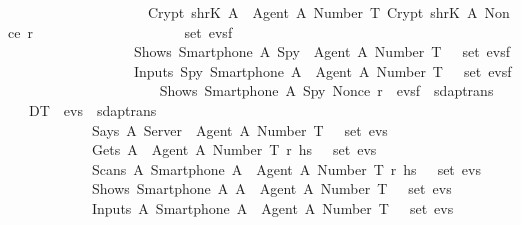 \begin{isabellebody}
  \ \ \ \ \ \ \ \ \ \ \ \ \ \ \ \ \ \ \ \ Crypt\ {\isacharparenleft}shrK\ A{\isacharparenright}\ {\isasymlbrace}\ {\isasymlbrace}Agent\ A{\isacharcomma}\ Number\ T{\isasymrbrace}{\isacharcomma}\ Crypt\ {\isacharparenleft}shrK\ A{\isacharparenright}\ {\isacharparenleft}Nonce\ r{\isacharparenright}\ {\isasymrbrace}\isanewline
  \ \ \ \ \ \ \ \ \ \ \ \ \ \ \ \ \ \ {\isasymrbrace}\ {\isasymin}\ set\ evs{}f{\isacharsemicolon}\isanewline
  \ \ \ \ \ \ \ \ \ \ \ \ \ \ \ \ \ \ Shows\ {\isacharparenleft}Smartphone\ A{\isacharparenright}\ Spy\ {\isasymlbrace}\ Agent\ A{\isacharcomma}\ Number\ T\ {\isasymrbrace}\ {\isasymin}\ set\ evs{}f{\isacharsemicolon}\isanewline
  \ \ \ \ \ \ \ \ \ \ \ \ \ \ \ \ \ \ Inputs\ Spy\ {\isacharparenleft}Smartphone\ A{\isacharparenright}\ {\isasymlbrace}\ Agent\ A{\isacharcomma}\ Number\ T\ {\isasymrbrace}\ {\isasymin}\ set\ evs{}f\isanewline
  \ \ \ \ \ \ \ \ \ \ \ \ \ \ \ \ {\isasymrbrakk}\isanewline
  \ \ \ \ {\isasymLongrightarrow}\ Shows\ {\isacharparenleft}Smartphone\ A{\isacharparenright}\ Spy\ {\isacharparenleft}Nonce\ r{\isacharparenright}\ {\isacharhash}\ evs{}f\ {\isasymin}\ sdaptrans{\isachardoublequoteclose}\isanewline
  \isanewline
  \ \ {\isacharbar}\ DT{}{\isacharcolon}\ {\isachardoublequoteopen}{\isasymlbrakk}\ evs{}\ {\isasymin}\ sdaptrans{\isacharsemicolon}\isanewline
  \ \ \ \ \ \ \ \ \ \ \ \ Says\ A\ Server\ {\isasymlbrace}\ Agent\ A{\isacharcomma}\ Number\ T\ {\isasymrbrace}\ {\isasymin}\ set\ evs{}{\isacharsemicolon}\isanewline
  \ \ \ \ \ \ \ \ \ \ \ \ Gets\ A\ {\isasymlbrace}\ {\isasymlbrace}Agent\ A{\isacharcomma}\ Number\ T{\isasymrbrace}{\isacharcomma}\ r{\isacharprime}{\isacharcomma}\ h\isactrlsub s\ {\isasymrbrace}\ {\isasymin}\ set\ evs{}{\isacharsemicolon}\isanewline
  \ \ \ \ \ \ \ \ \ \ \ \ Scans\ A\ {\isacharparenleft}Smartphone\ A{\isacharparenright}\ {\isasymlbrace}\ {\isasymlbrace}Agent\ A{\isacharcomma}\ Number\ T{\isasymrbrace}{\isacharcomma}\ r{\isacharprime}{\isacharcomma}\ h\isactrlsub s\ {\isasymrbrace}\ {\isasymin}\ set\ evs{}{\isacharsemicolon}\isanewline
  \ \ \ \ \ \ \ \ \ \ \ \ Shows\ {\isacharparenleft}Smartphone\ A{\isacharparenright}\ A\ {\isasymlbrace}\ Agent\ A{\isacharcomma}\ Number\ T\ {\isasymrbrace}\ {\isasymin}\ set\ evs{}{\isacharsemicolon}\isanewline
  \ \ \ \ \ \ \ \ \ \ \ \ Inputs\ A\ {\isacharparenleft}Smartphone\ A{\isacharparenright}\ {\isasymlbrace}\ Agent\ A{\isacharcomma}\ Number\ T\ {\isasymrbrace}\ {\isasymin}\ set\ evs{}{\isacharsemicolon}\isanewline

\end{isabellebody}
